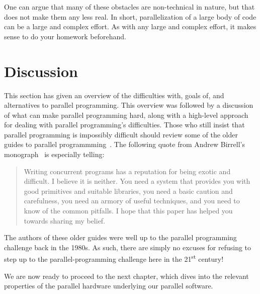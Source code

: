 {	One can argue that many of these obstacles are non-technical
	in nature, but that does not make them any less real.
	In short, parallelization of a large body of code
	can be a large and complex effort.
	As with any large and complex effort, it makes sense to
	do your homework beforehand.
} \QuickQuizEnd

\section{Discussion}
\label{sec:intro:Discussion}

This section has given an overview of the difficulties with, goals of,
and alternatives to parallel programming.
This overview was followed by a discussion of
what can make parallel programming hard, along with a high-level
approach for dealing with parallel programming's difficulties.
Those who still insist that parallel programming is impossibly difficult
should review some of the older guides to parallel
programmming~\cite{SQNTParallel,AndrewDBirrell1989Threads,Beck85,Inman85}.
The following quote from Andrew Birrell's
monograph~\cite{AndrewDBirrell1989Threads} is especially telling:

\begin{quote}
	Writing concurrent programs has a reputation for being exotic
	and difficult. I believe it is neither. You need a system
	that provides you with good primitives and suitable libraries,
	you need a basic caution and carefulness, you need an armory of
	useful techniques, and you need to know of the common pitfalls. I
	hope that this paper has helped you towards sharing my belief.
\end{quote}

The authors of these older guides were well up to the parallel programming
challenge back in the 1980s.
As such, there are simply no excuses for refusing to step up to the
parallel-programming challenge here in the 21\textsuperscript{st} century!

We are now ready to proceed to the next chapter, which dives into the
relevant properties of the parallel hardware underlying our parallel
software.
